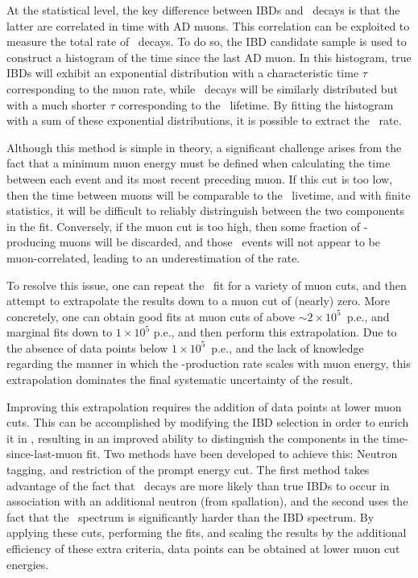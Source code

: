 \documentclass[../thesis.tex]{subfiles}
\begin{document}
At the statistical level, the key difference between IBDs and \linine\ decays is
that the latter are correlated in time with AD muons. This correlation can be
exploited to measure the total rate of \linine\ decays. To do so, the IBD
candidate sample is used to construct a histogram of the time since the last AD
muon. In this histogram, true IBDs will exhibit an exponential distribution with
a characteristic time $\tau$ corresponding to the muon rate, while \linine\
decays will be similarly distributed but with a much shorter $\tau$
corresponding to the \linine\ lifetime. By fitting the histogram with a sum of
these exponential distributions, it is possible to extract the \linine\ rate.

Although this method is simple in theory, a significant challenge arises from
the fact that a minimum muon energy must be defined when calculating the time
between each event and its most recent preceding muon. If this cut is too low,
then the time between muons will be comparable to the \linine\ livetime, and
with finite statistics, it will be difficult to reliably distringuish between
the two components in the fit. Conversely, if the muon cut is too high, then
some fraction of \linine-producing muons will be discarded, and those \linine\
events will not appear to be muon-correlated, leading to an underestimation of
the rate.

To resolve this issue, one can repeat the \linine\ fit for a variety of muon
cuts, and then attempt to extrapolate the results down to a muon cut of (nearly)
zero. More concretely, one can obtain good fits at muon cuts of above $\sim
2\times10^5$~p.e., and marginal fits down to $1\times10^5$ p.e., and then
perform this extrapolation. Due to the absence of data points below
$1\times10^5$~p.e., and the lack of knowledge regarding the manner in which the
\linine-production rate scales with muon energy, this extrapolation dominates
the final systematic uncertainty of the result.

Improving this extrapolation requires the addition of data points at lower muon
cuts. This can be accomplished by modifying the IBD selection in order to enrich
it in \linine, resulting in an improved ability to distinguish the components in
the time-since-last-muon fit. Two methods have been developed to achieve this:
Neutron tagging, and restriction of the prompt energy cut. The first method
takes advantage of the fact that \linine\ decays are more likely than true IBDs
to occur in association with an additional neutron (from spallation), and the
second uses the fact that the \linine\ spectrum is significantly harder than the
IBD spectrum. By applying these cuts, performing the fits, and scaling the
results by the additional efficiency of these extra criteria, data points can be
obtained at lower muon cut energies.
\end{document}
